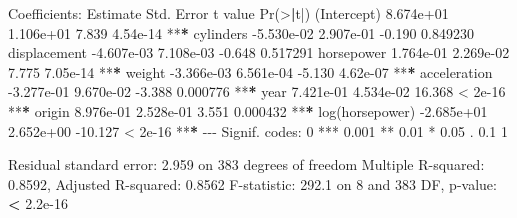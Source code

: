 \documentclass[
]{article}
\newenvironment{Shaded}{\begin{snugshade}}{\end{snugshade}}
\newcommand{\DecValTok}[1]{\textcolor[rgb]{0.00,0.00,0.81}{#1}}
\newcommand{\ErrorTok}[1]{\textcolor[rgb]{0.64,0.00,0.00}{\textbf{#1}}}
\newcommand{\FloatTok}[1]{\textcolor[rgb]{0.00,0.00,0.81}{#1}}
\newcommand{\FunctionTok}[1]{\textcolor[rgb]{0.00,0.00,0.00}{#1}}
\newcommand{\NormalTok}[1]{#1}
\newcommand{\SpecialCharTok}[1]{\textcolor[rgb]{0.00,0.00,0.00}{#1}}
\newcommand{\StringTok}[1]{\textcolor[rgb]{0.31,0.60,0.02}{#1}}
\begin{document}
\begin{Shaded}
\begin{Highlighting}[]
\NormalTok{Coefficients}\SpecialCharTok{:}
\NormalTok{                  Estimate Std. Error t value }\FunctionTok{Pr}\NormalTok{(}\SpecialCharTok{\textgreater{}}\ErrorTok{|}\NormalTok{t}\SpecialCharTok{|}\NormalTok{)    }
\NormalTok{(Intercept)      }\FloatTok{8.674e+01}  \FloatTok{1.106e+01}   \FloatTok{7.839} \FloatTok{4.54e{-}14} \SpecialCharTok{**}\ErrorTok{*}
\NormalTok{cylinders       }\SpecialCharTok{{-}}\FloatTok{5.530e{-}02}  \FloatTok{2.907e{-}01}  \SpecialCharTok{{-}}\FloatTok{0.190} \FloatTok{0.849230}    
\NormalTok{displacement    }\SpecialCharTok{{-}}\FloatTok{4.607e{-}03}  \FloatTok{7.108e{-}03}  \SpecialCharTok{{-}}\FloatTok{0.648} \FloatTok{0.517291}    
\NormalTok{horsepower       }\FloatTok{1.764e{-}01}  \FloatTok{2.269e{-}02}   \FloatTok{7.775} \FloatTok{7.05e{-}14} \SpecialCharTok{**}\ErrorTok{*}
\NormalTok{weight          }\SpecialCharTok{{-}}\FloatTok{3.366e{-}03}  \FloatTok{6.561e{-}04}  \SpecialCharTok{{-}}\FloatTok{5.130} \FloatTok{4.62e{-}07} \SpecialCharTok{**}\ErrorTok{*}
\NormalTok{acceleration    }\SpecialCharTok{{-}}\FloatTok{3.277e{-}01}  \FloatTok{9.670e{-}02}  \SpecialCharTok{{-}}\FloatTok{3.388} \FloatTok{0.000776} \SpecialCharTok{**}\ErrorTok{*}
\NormalTok{year             }\FloatTok{7.421e{-}01}  \FloatTok{4.534e{-}02}  \FloatTok{16.368}  \SpecialCharTok{\textless{}} \FloatTok{2e{-}16} \SpecialCharTok{**}\ErrorTok{*}
\NormalTok{origin           }\FloatTok{8.976e{-}01}  \FloatTok{2.528e{-}01}   \FloatTok{3.551} \FloatTok{0.000432} \SpecialCharTok{**}\ErrorTok{*}
\FunctionTok{log}\NormalTok{(horsepower) }\SpecialCharTok{{-}}\FloatTok{2.685e+01}  \FloatTok{2.652e+00} \SpecialCharTok{{-}}\FloatTok{10.127}  \SpecialCharTok{\textless{}} \FloatTok{2e{-}16} \SpecialCharTok{**}\ErrorTok{*}
\SpecialCharTok{{-}{-}{-}}
\NormalTok{Signif. codes}\SpecialCharTok{:}  \DecValTok{0} \StringTok{\textquotesingle{}***\textquotesingle{}} \FloatTok{0.001} \StringTok{\textquotesingle{}**\textquotesingle{}} \FloatTok{0.01} \StringTok{\textquotesingle{}*\textquotesingle{}} \FloatTok{0.05} \StringTok{\textquotesingle{}.\textquotesingle{}} \FloatTok{0.1} \StringTok{\textquotesingle{} \textquotesingle{}} \DecValTok{1}

\NormalTok{Residual standard error}\SpecialCharTok{:} \FloatTok{2.959}\NormalTok{ on }\DecValTok{383}\NormalTok{ degrees of freedom}
\NormalTok{Multiple R}\SpecialCharTok{{-}}\NormalTok{squared}\SpecialCharTok{:}  \FloatTok{0.8592}\NormalTok{,    Adjusted R}\SpecialCharTok{{-}}\NormalTok{squared}\SpecialCharTok{:}  \FloatTok{0.8562} 
\NormalTok{F}\SpecialCharTok{{-}}\NormalTok{statistic}\SpecialCharTok{:} \FloatTok{292.1}\NormalTok{ on }\DecValTok{8}\NormalTok{ and }\DecValTok{383}\NormalTok{ DF,  p}\SpecialCharTok{{-}}\NormalTok{value}\SpecialCharTok{:} \ErrorTok{\textless{}} \FloatTok{2.2e{-}16}
\end{Highlighting}
\end{Shaded}
\end{document}
